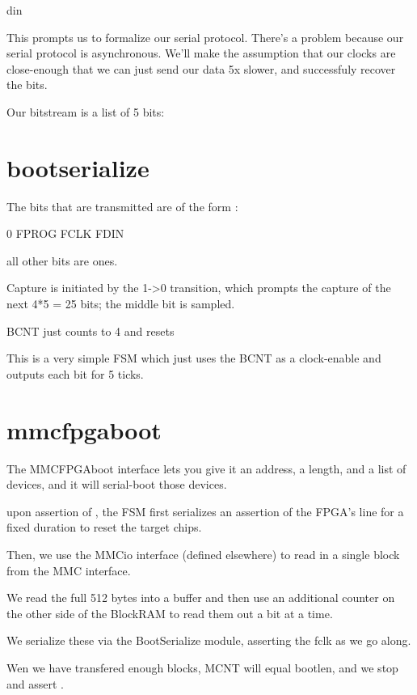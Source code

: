 din

This prompts us to formalize our serial protocol. There's a problem
because our serial protocol is asynchronous. We'll make the assumption
that our clocks are close-enough that we can just send our data 5x
slower, and successfuly recover the bits.


Our bitstream is a list of 5 bits:


\section{bootserialize}

The bits that are transmitted are of the form : 

0
FPROG
FCLK
FDIN

all other bits are ones. 

Capture is initiated by the 1->0 transition, which prompts the capture
of the next 4*5 = 25 bits; the middle bit is sampled.

BCNT just counts to 4 and resets

This is a very simple FSM which just uses the BCNT as a clock-enable
and outputs each bit for 5 ticks.


\section{mmcfpgaboot}

The MMCFPGAboot interface lets you give it an address, a length, and a
list of devices, and it will serial-boot those devices.

upon assertion of , the FSM first serializes an
assertion of the FPGA's  line for a fixed duration to
reset the target chips.

Then, we use the MMCio interface (defined elsewhere) to read in a
single block from the MMC interface.

We read the full 512 bytes into a buffer and then use an additional
counter on the other side of the BlockRAM to read them out a bit at a
time. 

We serialize these via the BootSerialize module, asserting the fclk as
we go along.

Wen we have transfered enough blocks, MCNT will equal bootlen, and we
stop and assert .

